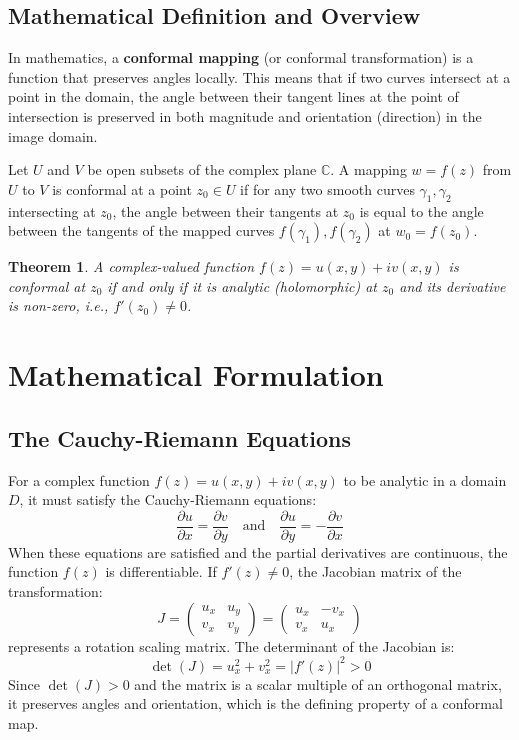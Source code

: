 \documentclass[12pt,a4paper]{article}
\newtheorem{theorem}{Theorem}[section]
\begin{document}
\subsection{Mathematical Definition and Overview}
In mathematics, a \textbf{conformal mapping} (or conformal transformation) is a function that preserves angles locally. This means that if two curves intersect at a point in the domain, the angle between their tangent lines at the point of intersection is preserved in both magnitude and orientation (direction) in the image domain.

Let $U$ and $V$ be open subsets of the complex plane $\mathbb{C}$. A mapping $w = f(z)$ from $U$ to $V$ is conformal at a point $z_0 \in U$ if for any two smooth curves $\gamma_1, \gamma_2$ intersecting at $z_0$, the angle between their tangents at $z_0$ is equal to the angle between the tangents of the mapped curves $f(\gamma_1), f(\gamma_2)$ at $w_0 = f(z_0)$.

\begin{theorem}
A complex-valued function $f(z) = u(x,y) + iv(x,y)$ is conformal at $z_0$ if and only if it is analytic (holomorphic) at $z_0$ and its derivative is non-zero, i.e., $f'(z_0) \neq 0$.
\end{theorem}

\section{Mathematical Formulation}
\subsection{The Cauchy-Riemann Equations}
For a complex function $f(z) = u(x,y) + iv(x,y)$ to be analytic in a domain $D$, it must satisfy the Cauchy-Riemann equations:
\begin{equation}
    \frac{\partial u}{\partial x} = \frac{\partial v}{\partial y} \quad \text{and} \quad \frac{\partial u}{\partial y} = -\frac{\partial v}{\partial x}
\end{equation}
When these equations are satisfied and the partial derivatives are continuous, the function $f(z)$ is differentiable. If $f'(z) \neq 0$, the Jacobian matrix of the transformation:
\begin{equation}
    J = \begin{pmatrix}
        u_x & u_y \\
        v_x & v_y
    \end{pmatrix} = \begin{pmatrix}
        u_x & -v_x \\
        v_x & u_x
    \end{pmatrix}
\end{equation}
represents a rotation scaling matrix. The determinant of the Jacobian is:
\begin{equation}
    \det(J) = u_x^2 + v_x^2 = |f'(z)|^2 > 0
\end{equation}
Since $\det(J) > 0$ and the matrix is a scalar multiple of an orthogonal matrix, it preserves angles and orientation, which is the defining property of a conformal map.
\end{document}
